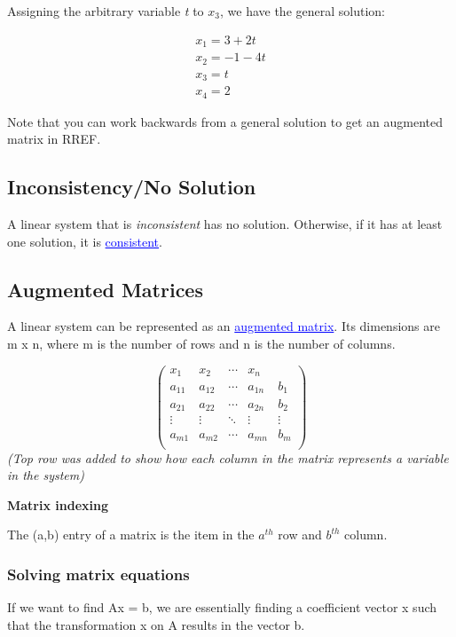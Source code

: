 \documentclass{article}
\newcommand{\bul}[1]{\textcolor{blue}{\underline{#1}}}
\begin{document}
Assigning the arbitrary variable \textit{t} to $x_3$, we have the general solution:


\begin{gather*}
    x_1 = 3 + 2t \\
    x_2 = -1 - 4t \\
    x_3 = t \\ 
    x_4 = 2
\end{gather*}

Note that you can work backwards from a general solution to get an augmented matrix in RREF.

\subsection{Inconsistency/No Solution}
A linear system that is \textit{inconsistent} has no solution. Otherwise, if it has at least one solution, it is \bul{consistent}.

\subsection{Augmented Matrices}
A linear system can be represented as an \bul{augmented matrix}. Its dimensions are m x n, where m is the number of rows and n is the number of columns.

\[
\left( 
\begin{array}{cccc|c}
    x_1 & x_2 & \cdots  & x_n & \\
    \hline
a_{11} & a_{12} & \cdots & a_{1n} & b_1 \\
a_{21} & a_{22} & \cdots & a_{2n} & b_2 \\
\vdots & \vdots & \ddots & \vdots & \vdots \\
a_{m1} & a_{m2} & \cdots & a_{mn} & b_m \\
\end{array}
\right)
\]
\textit{(Top row was added to show how each column in the matrix represents a variable in the system)}

\vspace{10pt}

\textbf{Matrix indexing}

The (a,b) entry of a matrix is the item in the $a^{th}$ row and $b^{th}$ column.

\subsubsection{Solving matrix equations}
If we want to find Ax = b, we are essentially finding a coefficient vector x such that the transformation x on A results in the vector b.
\end{document}
